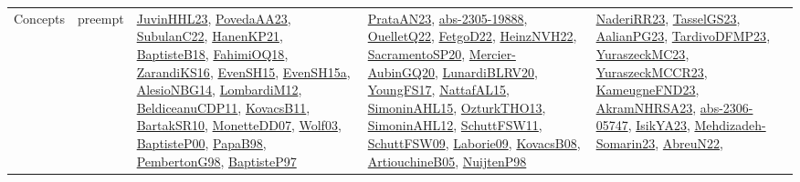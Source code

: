 {\begin{longtable}{lp{3cm}>{\raggedright}p{6cm}>{\raggedright}p{6cm}p{8cm}}
Concepts & preempt & \href{papers/JuvinHHL23.pdf}{JuvinHHL23}\cite{JuvinHHL23}, \href{papers/PovedaAA23.pdf}{PovedaAA23}\cite{PovedaAA23}, \href{articles/SubulanC22.pdf}{SubulanC22}\cite{SubulanC22}, \href{papers/HanenKP21.pdf}{HanenKP21}\cite{HanenKP21}, \href{articles/BaptisteB18.pdf}{BaptisteB18}\cite{BaptisteB18}, \href{articles/FahimiOQ18.pdf}{FahimiOQ18}\cite{FahimiOQ18}, \href{articles/ZarandiKS16.pdf}{ZarandiKS16}\cite{ZarandiKS16}, \href{papers/EvenSH15.pdf}{EvenSH15}\cite{EvenSH15}, \href{articles/EvenSH15a.pdf}{EvenSH15a}\cite{EvenSH15a}, \href{papers/AlesioNBG14.pdf}{AlesioNBG14}\cite{AlesioNBG14}, \href{articles/LombardiM12.pdf}{LombardiM12}\cite{LombardiM12}, \href{articles/BeldiceanuCDP11.pdf}{BeldiceanuCDP11}\cite{BeldiceanuCDP11}, \href{articles/KovacsB11.pdf}{KovacsB11}\cite{KovacsB11}, \href{articles/BartakSR10.pdf}{BartakSR10}\cite{BartakSR10}, \href{papers/MonetteDD07.pdf}{MonetteDD07}\cite{MonetteDD07}, \href{papers/Wolf03.pdf}{Wolf03}\cite{Wolf03}, \href{articles/BaptisteP00.pdf}{BaptisteP00}\cite{BaptisteP00}, \href{articles/PapaB98.pdf}{PapaB98}\cite{PapaB98}, \href{papers/PembertonG98.pdf}{PembertonG98}\cite{PembertonG98}, \href{papers/BaptisteP97.pdf}{BaptisteP97}\cite{BaptisteP97} & \href{articles/PrataAN23.pdf}{PrataAN23}\cite{PrataAN23}, \href{articles/abs-2305-19888.pdf}{abs-2305-19888}\cite{abs-2305-19888}, \href{papers/OuelletQ22.pdf}{OuelletQ22}\cite{OuelletQ22}, \href{articles/FetgoD22.pdf}{FetgoD22}\cite{FetgoD22}, \href{articles/HeinzNVH22.pdf}{HeinzNVH22}\cite{HeinzNVH22}, \href{articles/SacramentoSP20.pdf}{SacramentoSP20}\cite{SacramentoSP20}, \href{papers/Mercier-AubinGQ20.pdf}{Mercier-AubinGQ20}\cite{Mercier-AubinGQ20}, \href{articles/LunardiBLRV20.pdf}{LunardiBLRV20}\cite{LunardiBLRV20}, \href{papers/YoungFS17.pdf}{YoungFS17}\cite{YoungFS17}, \href{articles/NattafAL15.pdf}{NattafAL15}\cite{NattafAL15}, \href{articles/SimoninAHL15.pdf}{SimoninAHL15}\cite{SimoninAHL15}, \href{articles/OzturkTHO13.pdf}{OzturkTHO13}\cite{OzturkTHO13}, \href{papers/SimoninAHL12.pdf}{SimoninAHL12}\cite{SimoninAHL12}, \href{articles/SchuttFSW11.pdf}{SchuttFSW11}\cite{SchuttFSW11}, \href{papers/SchuttFSW09.pdf}{SchuttFSW09}\cite{SchuttFSW09}, \href{papers/Laborie09.pdf}{Laborie09}\cite{Laborie09}, \href{articles/KovacsB08.pdf}{KovacsB08}\cite{KovacsB08}, \href{papers/ArtiouchineB05.pdf}{ArtiouchineB05}\cite{ArtiouchineB05}, \href{articles/NuijtenP98.pdf}{NuijtenP98}\cite{NuijtenP98} & \href{articles/NaderiRR23.pdf}{NaderiRR23}\cite{NaderiRR23}, \href{papers/TasselGS23.pdf}{TasselGS23}\cite{TasselGS23}, \href{papers/AalianPG23.pdf}{AalianPG23}\cite{AalianPG23}, \href{papers/TardivoDFMP23.pdf}{TardivoDFMP23}\cite{TardivoDFMP23}, \href{papers/YuraszeckMC23.pdf}{YuraszeckMC23}\cite{YuraszeckMC23}, \href{articles/YuraszeckMCCR23.pdf}{YuraszeckMCCR23}\cite{YuraszeckMCCR23}, \href{papers/KameugneFND23.pdf}{KameugneFND23}\cite{KameugneFND23}, \href{articles/AkramNHRSA23.pdf}{AkramNHRSA23}\cite{AkramNHRSA23}, \href{articles/abs-2306-05747.pdf}{abs-2306-05747}\cite{abs-2306-05747}, \href{articles/IsikYA23.pdf}{IsikYA23}\cite{IsikYA23}, \href{papers/Mehdizadeh-Somarin23.pdf}{Mehdizadeh-Somarin23}\cite{Mehdizadeh-Somarin23}, \href{articles/AbreuN22.pdf}{AbreuN22}\cite{AbreuN22}, 
\end{longtable}}
